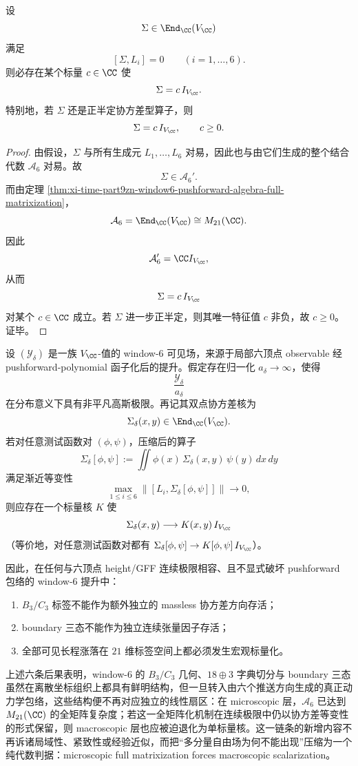 \begin{theorem}\label{thm:xi-time-part9zn-window6-pushforward-equivariant-quadratic-scalar-rigidity}
设
\[
\Sigma\in \End_{\CC}(V_{\CC})
\]
满足
\[
[\Sigma,L_i]=0
\qquad (i=1,\dots,6).
\]
则必存在某个标量 \(c\in\CC\) 使
\[
\Sigma=c\,I_{V_{\CC}}.
\]
特别地，若 \(\Sigma\) 还是正半定协方差型算子，则
\[
\Sigma=c\,I_{V_{\CC}},
\qquad
c\ge 0.
\]
\end{theorem}
\begin{proof}
由假设，\(\Sigma\) 与所有生成元 \(L_1,\dots,L_6\) 对易，因此也与由它们生成的整个结合代数 \(\mathcal A_6\) 对易。故
\[
\Sigma\in \mathcal A_6'.
\]
而由定理 \ref{thm:xi-time-part9zn-window6-pushforward-algebra-full-matrixization}，
\[
\mathcal A_6=\End_{\CC}(V_{\CC})\cong M_{21}(\CC).
\]
因此
\[
\mathcal A_6'=\CC I_{V_{\CC}},
\]
从而
\[
\Sigma=c\,I_{V_{\CC}}
\]
对某个 \(c\in\CC\) 成立。若 \(\Sigma\) 进一步正半定，则其唯一特征值 \(c\) 非负，故 \(c\ge 0\)。证毕。
\end{proof}

\begin{conjecture}\label{conj:xi-time-part9zn-window6-full-matrixization-macroscopic-scalarization}
设 \((\mathcal Y_\delta)\) 是一族 \(V_{\CC}\)-值的 window-\(6\) 可见场，来源于局部六顶点 observable 经 pushforward-polynomial 函子化后的提升。假定存在归一化 \(a_\delta\to\infty\)，使得
\[
\frac{\mathcal Y_\delta}{a_\delta}
\]
在分布意义下具有非平凡高斯极限。再记其双点协方差核为
\[
\Sigma_\delta(x,y)\in \End_{\CC}(V_{\CC}).
\]
若对任意测试函数对 \((\phi,\psi)\)，压缩后的算子
\[
\Sigma_\delta[\phi,\psi]
:=
\iint \phi(x)\,\Sigma_\delta(x,y)\,\psi(y)\,dx\,dy
\]
满足渐近等变性
\[
\max_{1\le i\le 6}
\bigl\|
[L_i,\Sigma_\delta[\phi,\psi]]
\bigr\|
\longrightarrow 0,
\]
则应存在一个标量核 \(K\) 使
\[
\Sigma_\delta(x,y)\longrightarrow K(x,y)\,I_{V_{\CC}}
\]
（等价地，对任意测试函数对都有
\(\Sigma_\delta[\phi,\psi]\to K[\phi,\psi]\,I_{V_{\CC}}\)）。

因此，在任何与六顶点 height/GFF 连续极限相容、且不显式破坏 pushforward 包络的 window-\(6\) 提升中：
\begin{enumerate}
  \item \(B_3/C_3\) 标签不能作为额外独立的 massless 协方差方向存活；
  \item boundary 三态不能作为独立连续张量因子存活；
  \item 全部可见长程涨落在 \(21\) 维标签空间上都必须发生宏观标量化。
\end{enumerate}
\end{conjecture}

上述六条后果表明，window-\(6\) 的 \(B_3/C_3\) 几何、\(18\oplus 3\) 字典切分与 boundary 三态虽然在离散坐标组织上都具有鲜明结构，但一旦转入由六个推送方向生成的真正动力学包络，这些结构便不再对应独立的线性扇区：在 microscopic 层，\(\mathcal A_6\) 已达到 \(M_{21}(\CC)\) 的全矩阵复杂度；若这一全矩阵化机制在连续极限中仍以协方差等变性的形式保留，则 macroscopic 层也应被迫退化为单标量核。这一链条的新增内容不再诉诸局域性、紧致性或经验近似，而把“多分量自由场为何不能出现”压缩为一个纯代数判据：microscopic full matrixization forces macroscopic scalarization。

